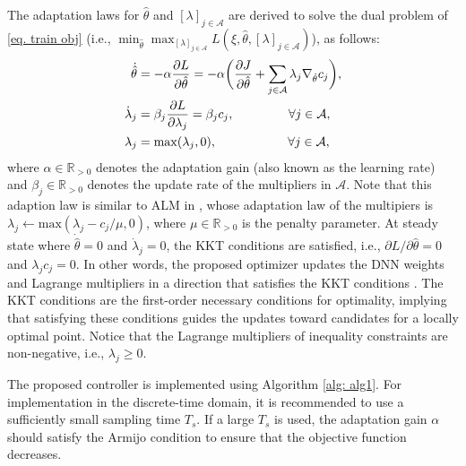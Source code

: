 \documentclass[lettersize,journal]{IEEEtran}
\begin{document}
The adaptation laws for $\hat\theta$ and $[\lambda]_{j\in\mathcal A}$ are derived to solve the dual problem of \eqref{eq. train obj} (i.e.,  $\min_{\hat\theta} \max_{[\lambda]_{j\in\mathcal A}}L(\xi,\hat\theta,[\lambda]_{j\in\mathcal A})$), as follows:
    \begin{align}
            \dot {\hat\theta}&=-\alpha {\partial L\over\partial \hat\theta}
            =-\alpha 
            \bigg(
            {\partial J\over \partial \hat\theta}+\sum_{j\in\mathcal{A}}
            \lambda_j \nabla_{\hat\theta} c_j
            \bigg),
        \label{eq. adaptation law th}
            \\
            \dot\lambda_j& = \beta_j{\partial L\over\partial \lambda_j} = \beta_j c_j ,
            \quad\quad\quad\quad      \      
            \forall j\in\mathcal A,
        \label{eq. adaptation law L}
            \\
            \lambda_j & = \max(\lambda_j,0) ,
            \quad\quad\quad\quad\ \ \ \ \ 
            \forall j\in\mathcal A,
        \label{eq. adaptation law L max}
    \end{align}
where $\alpha\in\mathbb{R}_{>0}$ denotes the adaptation gain (also known as the learning rate) and $\beta_j\in\mathbb{R}_{>0}$ denotes the update rate of the multipliers in $\mathcal A$.
Note that this adaption law is similar to ALM in \cite{RN22}, whose adaptation law of the multipiers is $\lambda_j\leftarrow \text{max}(\lambda_j-c_j/\mu,0)$, where $\mu\in\mathbb{R}_{>0}$ is the penalty parameter.
At steady state where $\dot{\hat\theta}=0$ and $\dot\lambda_j=0$, the KKT conditions are satisfied, i.e., $\partial L/\partial \hat\theta=0$ and $\lambda_j c_j=0$.
In other words, the proposed optimizer updates the DNN weights and Lagrange multipliers in a direction that satisfies the KKT conditions \cite[Chap.~12 T.~12.1]{RN22}.
The KKT conditions are the first-order necessary conditions for optimality, implying that satisfying these conditions guides the updates toward candidates for a locally optimal point.
Notice that the Lagrange multipliers of inequality constraints are non-negative, i.e., $\lambda_j\ge 0$.

The proposed controller is implemented using Algorithm \ref{alg: alg1}. For implementation in the discrete-time domain, it is recommended to use a sufficiently small sampling time $T_s$. If a large $T_s$ is used, the adaptation gain $\alpha$ should satisfy the Armijo condition \cite[Chap.~3 eq.~(3.4)]{RN22} to ensure that the objective function decreases.
\end{document}
